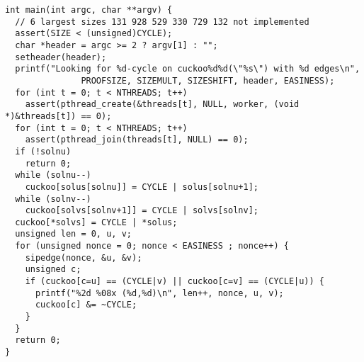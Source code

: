 \documentclass[11pt, oneside]{article}
\begin{document}
\begin{verbatim}
int main(int argc, char **argv) {
  // 6 largest sizes 131 928 529 330 729 132 not implemented
  assert(SIZE < (unsigned)CYCLE);
  char *header = argc >= 2 ? argv[1] : "";
  setheader(header);
  printf("Looking for %d-cycle on cuckoo%d%d(\"%s\") with %d edges\n",
               PROOFSIZE, SIZEMULT, SIZESHIFT, header, EASINESS);
  for (int t = 0; t < NTHREADS; t++)
    assert(pthread_create(&threads[t], NULL, worker, (void *)&threads[t]) == 0);
  for (int t = 0; t < NTHREADS; t++)
    assert(pthread_join(threads[t], NULL) == 0);
  if (!solnu)
    return 0;
  while (solnu--)
    cuckoo[solus[solnu]] = CYCLE | solus[solnu+1];
  while (solnv--)
    cuckoo[solvs[solnv+1]] = CYCLE | solvs[solnv];
  cuckoo[*solvs] = CYCLE | *solus;
  unsigned len = 0, u, v;
  for (unsigned nonce = 0; nonce < EASINESS ; nonce++) {
    sipedge(nonce, &u, &v);
    unsigned c;
    if (cuckoo[c=u] == (CYCLE|v) || cuckoo[c=v] == (CYCLE|u)) {
      printf("%2d %08x (%d,%d)\n", len++, nonce, u, v);
      cuckoo[c] &= ~CYCLE;
    }
  }
  return 0;
}
\end{verbatim}
\end{document}

